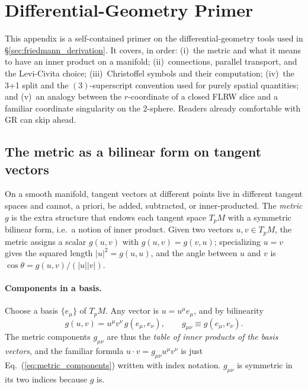 \documentclass[12pt]{article}
\begin{document}


\appendix

\section{Differential-Geometry Primer}
\label{app:diffgeo}

This appendix is a self-contained primer on the differential-geometry
tools used in \S\ref{sec:friedmann_derivation}.  It covers, in order: (i)~the
metric and what it means to have an inner product on a manifold;
(ii)~connections, parallel transport, and the Levi-Civita choice;
(iii)~Christoffel symbols and their computation; (iv)~the 3+1 split
and the $(3)$-superscript convention used for purely spatial
quantities; and (v)~an analogy between the $r$-coordinate of a
closed FLRW slice and a familiar coordinate singularity on the
2-sphere.  Readers already comfortable with GR can skip ahead.

\subsection{The metric as a bilinear form on tangent vectors}
\label{app:metric}

On a smooth manifold, tangent vectors at different points live in
different tangent spaces and cannot, a priori, be added, subtracted,
or inner-producted.  The \emph{metric} $g$ is the extra structure
that endows each tangent space $T_pM$ with a symmetric bilinear form,
i.e.\ a notion of inner product.  Given two vectors
$u,v \in T_pM$, the metric assigns a scalar
$g(u,v)$ with $g(u,v) = g(v,u)$; specializing $u=v$ gives the squared
length $|u|^2 = g(u,u)$, and the angle between $u$ and $v$ is
$\cos\theta = g(u,v)/(|u||v|)$.

\paragraph{Components in a basis.}  Choose a basis $\{e_\mu\}$ of
$T_pM$.  Any vector is $u = u^\mu e_\mu$, and by bilinearity
%
\begin{equation}
  g(u,v) = u^\mu v^\nu\,g(e_\mu, e_\nu),
  \qquad
  g_{\mu\nu} \equiv g(e_\mu, e_\nu).
  \label{eq:metric_components}
\end{equation}
%
The metric components $g_{\mu\nu}$ are thus the \emph{table of inner
products of the basis vectors}, and the familiar formula
$u\cdot v = g_{\mu\nu}u^\mu v^\nu$ is just Eq.~(\ref{eq:metric_components})
written with index notation.  $g_{\mu\nu}$ is symmetric in its two
indices because $g$ is.
\end{document}
